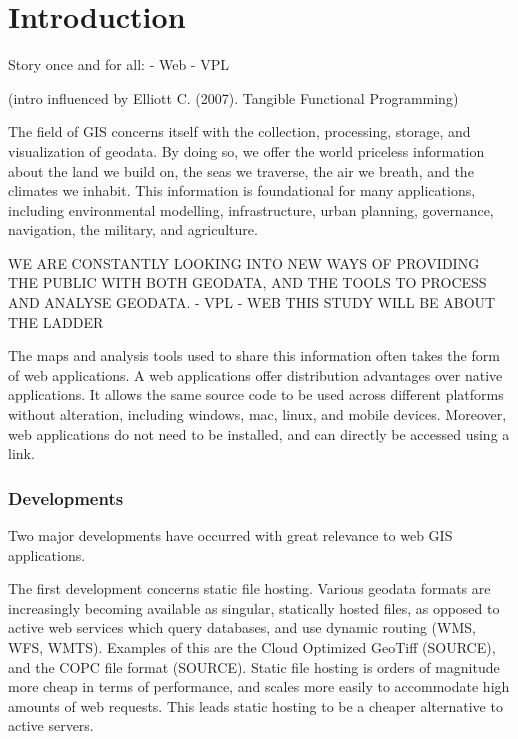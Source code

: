 \chapter{Introduction}
\label{chap:intro}

\begin{note}
  Story once and for all: 
  - Web 
  - VPL
\end{note}

\begin{note}
  (intro influenced by Elliott C. (2007). Tangible Functional Programming)
\end{note}

The field of \ac{GIS} concerns itself with the collection, processing, storage, and visualization of geodata. 
By doing so, we offer the world priceless information about the land we build on, the seas we traverse, the air we breath, and the climates we inhabit. 
This information is foundational for many applications, including environmental modelling, infrastructure, urban planning, governance, navigation, the military, and agriculture.   


WE ARE CONSTANTLY LOOKING INTO NEW WAYS OF PROVIDING THE PUBLIC WITH BOTH GEODATA, AND THE TOOLS TO PROCESS AND ANALYSE GEODATA.
- VPL
- WEB
THIS STUDY WILL BE ABOUT THE LADDER 

The maps and analysis tools used to share this information often takes the form of web applications.  
A web applications offer distribution advantages over native applications. 
It allows the same source code to be used across different platforms without alteration, including windows, mac, linux, and mobile devices. 
Moreover, web applications do not need to be installed, and can directly be accessed using a link. 

\subsection*{Developments}

Two major developments have occurred with great relevance to web GIS applications.

The first development concerns static file hosting.
Various geodata formats are increasingly becoming available as singular, statically hosted files, 
as opposed to active web services which query databases, and use dynamic routing (WMS, WFS, WMTS). 
Examples of this are the Cloud Optimized GeoTiff (SOURCE), and the COPC file format (SOURCE). 
Static file hosting is orders of magnitude more cheap in terms of performance, and scales more easily to accommodate high amounts of web requests.
This leads static hosting to be a cheaper alternative to active servers.


